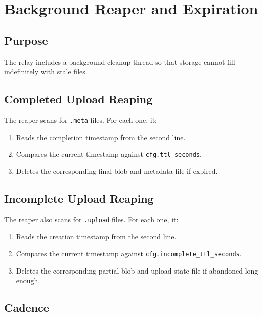 \documentclass[11pt,a4paper]{report}
\begin{document}
\chapter{Background Reaper and Expiration}

\section{Purpose}

The relay includes a background cleanup thread so that storage cannot fill indefinitely with stale files.

\section{Completed Upload Reaping}

The reaper scans for \texttt{.meta} files. For each one, it:

\begin{enumerate}
    \item Reads the completion timestamp from the second line.
    \item Compares the current timestamp against \texttt{cfg.ttl\_seconds}.
    \item Deletes the corresponding final blob and metadata file if expired.
\end{enumerate}

\section{Incomplete Upload Reaping}

The reaper also scans for \texttt{.upload} files. For each one, it:

\begin{enumerate}
    \item Reads the creation timestamp from the second line.
    \item Compares the current timestamp against \texttt{cfg.incomplete\_ttl\_seconds}.
    \item Deletes the corresponding partial blob and upload-state file if abandoned long enough.
\end{enumerate}

\section{Cadence}
\end{document}
